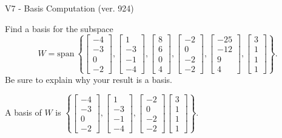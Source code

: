 \begin{exercise}
  \begin{exerciseTitle}V7 - Basis Computation (ver. 924)\end{exerciseTitle}
  \begin{exerciseStatement}
    Find a basis for the subspace 
\[W=\mathrm{span}\ \left\{\left[\begin{array}{r}
-4 \\
-3 \\
0 \\
-2
\end{array}\right] , \left[\begin{array}{r}
1 \\
-3 \\
-1 \\
-4
\end{array}\right] , \left[\begin{array}{r}
8 \\
6 \\
0 \\
4
\end{array}\right] , \left[\begin{array}{r}
-2 \\
0 \\
-2 \\
-2
\end{array}\right] , \left[\begin{array}{r}
-25 \\
-12 \\
9 \\
4
\end{array}\right] , \left[\begin{array}{r}
3 \\
1 \\
1 \\
1
\end{array}\right]\right\}.\]
 Be sure to explain why your result is a basis.


  \end{exerciseStatement}
  \begin{exerciseAnswer}
   A basis of \(W\) is  \(\left\{\left[\begin{array}{r}
-4 \\
-3 \\
0 \\
-2
\end{array}\right] , \left[\begin{array}{r}
1 \\
-3 \\
-1 \\
-4
\end{array}\right] , \left[\begin{array}{r}
-2 \\
0 \\
-2 \\
-2
\end{array}\right] \left[\begin{array}{r}
3 \\
1 \\
1 \\
1
\end{array}\right]\right\}\).
  


  \end{exerciseAnswer}
\end{exercise}
